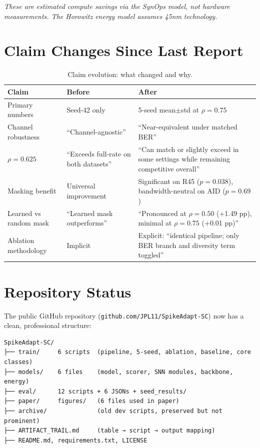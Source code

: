 \documentclass[11pt]{article}
\begin{document}
\emph{These are estimated compute savings via the SynOps model, not hardware measurements. The Horowitz energy model assumes 45nm technology.}

\section{Claim Changes Since Last Report}

\begin{table}[H]
\centering
\small
\caption{Claim evolution: what changed and why.}
\begin{tabular}{p{3.5cm} p{4.5cm} p{4.5cm}}
\toprule
\textbf{Claim} & \textbf{Before} & \textbf{After} \\
\midrule
Primary numbers & Seed-42 only & 5-seed mean$\pm$std at $\rho{=}0.75$ \\
Channel robustness & ``Channel-agnostic'' & ``Near-equivalent under matched BER'' \\
$\rho{=}0.625$ & ``Exceeds full-rate on both datasets'' & ``Can match or slightly exceed in some settings while remaining competitive overall'' \\
Masking benefit & Universal improvement & Significant on R45 ($p{=}0.038$), bandwidth-neutral on AID ($p{=}0.69$) \\
Learned vs random mask & ``Learned mask outperforms'' & ``Pronounced at $\rho{=}0.50$ ($+$1.49 pp), minimal at $\rho{=}0.75$ ($+$0.01 pp)'' \\
Ablation methodology & Implicit & Explicit: ``identical pipeline; only BER branch and diversity term toggled'' \\
\bottomrule
\end{tabular}
\end{table}

\section{Repository Status}

The public GitHub repository (\texttt{github.com/JPL11/SpikeAdapt-SC}) now has a clean, professional structure:

\begin{verbatim}
SpikeAdapt-SC/
├── train/     6 scripts  (pipeline, 5-seed, ablation, baseline, core classes)
├── models/    6 files    (model, scorer, SNN modules, backbone, energy)
├── eval/      12 scripts + 6 JSONs + seed_results/
├── paper/     figures/   (6 files used in paper)
├── archive/              (old dev scripts, preserved but not prominent)
├── ARTIFACT_TRAIL.md     (table → script → output mapping)
├── README.md, requirements.txt, LICENSE
\end{verbatim}
\end{document}
